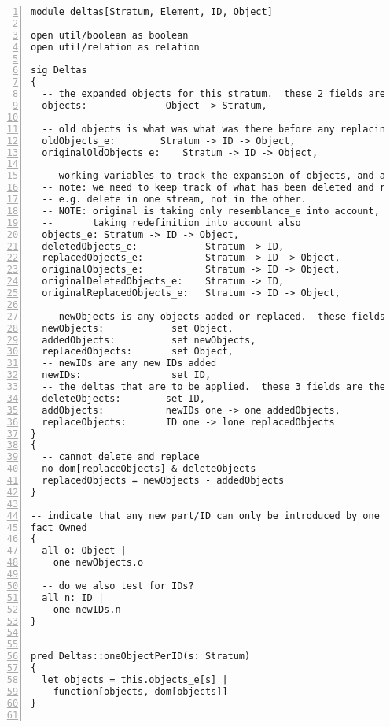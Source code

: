 \lstset{frame=tb, aboveskip=12pt, belowskip=-3pt, breaklines=true, basicstyle=\tiny\ttfamily, tabsize=2, mathescape=true}
\begin{lstlisting}[caption={deltas.als}, numbers=left]
module deltas[Stratum, Element, ID, Object]

open util/boolean as boolean
open util/relation as relation

sig Deltas
{
  -- the expanded objects for this stratum.  these 2 fields are the output of the merge!
  objects:              Object -> Stratum,

  -- old objects is what was what was there before any replacing was done
  oldObjects_e:        Stratum -> ID -> Object,
  originalOldObjects_e:    Stratum -> ID -> Object,

  -- working variables to track the expansion of objects, and allow it to happen cumulatively
  -- note: we need to keep track of what has been deleted and replaced to handle the cumulative effects
  -- e.g. delete in one stream, not in the other.
  -- NOTE: original is taking only resemblance_e into account, non-original is the full definition
  --       taking redefinition into account also
  objects_e: Stratum -> ID -> Object,
  deletedObjects_e:            Stratum -> ID,
  replacedObjects_e:           Stratum -> ID -> Object,  
  originalObjects_e:           Stratum -> ID -> Object,
  originalDeletedObjects_e:    Stratum -> ID,
  originalReplacedObjects_e:   Stratum -> ID -> Object,
  
  -- newObjects is any objects added or replaced.  these fields allow new object creation to be controlled
  newObjects:            set Object,
  addedObjects:          set newObjects,
  replacedObjects:       set Object,
  -- newIDs are any new IDs added
  newIDs:                set ID,  
  -- the deltas that are to be applied.  these 3 fields are the input to the merge
  deleteObjects:        set ID,
  addObjects:           newIDs one -> one addedObjects,
  replaceObjects:       ID one -> lone replacedObjects
}
{
  -- cannot delete and replace
  no dom[replaceObjects] & deleteObjects
  replacedObjects = newObjects - addedObjects
}

-- indicate that any new part/ID can only be introduced by one component
fact Owned
{
  all o: Object |
    one newObjects.o
  
  -- do we also test for IDs?
  all n: ID |
    one newIDs.n
}


pred Deltas::oneObjectPerID(s: Stratum)
{
  let objects = this.objects_e[s] |
    function[objects, dom[objects]]
}


\end{lstlisting}
